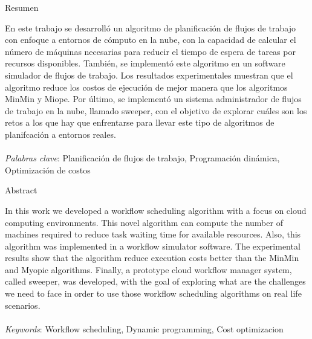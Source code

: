 \begin{center}
Resumen
\end{center}
\noindent En este trabajo se desarroll\'o un algoritmo de planificaci\'on de flujos de trabajo con enfoque a entornos de c\'omputo en la nube, con la capacidad de calcular el número de máquinas necesarias para reducir el tiempo de espera de tareas por recursos disponibles. Tambi\'en, se implement\'o este algoritmo en un software simulador de flujos de trabajo. Los resultados experimentales muestran que el algoritmo reduce los costos de ejecuci\'on de mejor manera que los algoritmos MinMin y Miope. Por \'ultimo, se implement\'o un sistema administrador de flujos de trabajo en la nube, llamado sweeper, con el objetivo de explorar cu\'ales son los retos a los que hay que enfrentarse para llevar este tipo de algoritmos de planifcaci\'on a entornos reales.
\\\\
\noindent \emph{Palabras clave}: Planificación de flujos de trabajo, Programaci\'on din\'amica, Optimizaci\'on de costos

\begin{center}
Abstract
\end{center}
\noindent In this work we developed a workflow scheduling algorithm with a focus on cloud computing environments. This novel algorithm can compute the number of machines required to reduce task waiting time for available resources. Also, this algorithm was implemented in a workflow simulator software. The experimental results show that the algorithm reduce execution costs better than the MinMin and Myopic algorithms. Finally, a prototype cloud workflow manager system, called sweeper, was developed, with the goal of exploring what are the challenges we need to face in order to use those workflow scheduling algorithms on real life scenarios.
\\\\
\noindent \emph{Keywords}: Workflow scheduling, Dynamic programming, Cost optimizacion

\clearpage
